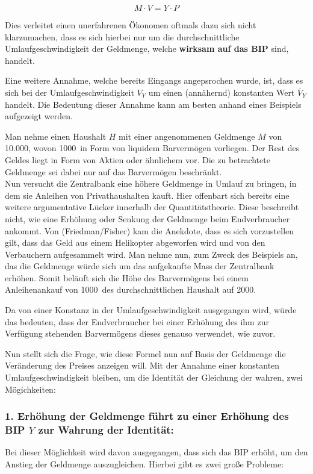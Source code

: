 $$ M \cdot V = Y \cdot P$$

Dies verleitet einen unerfahrenen Ökonomen oftmals dazu sich nicht klarzumachen, dass es sich hierbei nur um die durchschnittliche Umlaufgeschwindigkeit der Geldmenge, welche \textbf{wirksam auf das BIP} sind, handelt.

Eine weitere Annahme, welche bereits Eingangs angepsrochen wurde, ist, dass es sich bei der Umlaufgeschwindigkeit $V_Y$ um einen (annähernd) konstanten Wert $\overline{V}_Y$ handelt. Die Bedeutung dieser Annahme kann am besten anhand eines Beispiels aufgezeigt werden.

\begin{example}
    Man nehme einen Haushalt $H$ mit einer angenommenen Geldmenge $M$ von 10.000\EUR, wovon 1000\EUR\ in Form von liquidem Barvermögen vorliegen. Der Rest des Geldes liegt in Form von Aktien oder ähnlichem vor. Die zu betrachtete Geldmenge sei dabei nur auf das Barvermögen beschränkt. \\
    Nun versucht die Zentralbank eine höhere Geldmenge in Umlauf zu bringen, in dem sie Anleihen von Privathaushalten kauft. Hier offenbart sich bereits eine weitere argumentative Lücker innerhalb der Quantitätstheorie. Diese beschreibt nicht, wie eine Erhöhung oder Senkung der Geldmenge beim Endverbraucher ankommt. Von (Friedman/Fisher) kam die Anekdote, dass es sich vorzustellen gilt, dass das Geld aus einem Helikopter abgeworfen wird und von den Verbauchern aufgesammelt wird. Man nehme nun, zum Zweck des Beispiels an, das die Geldmenge würde sich um das aufgekaufte Mass der Zentralbank erhöhen. Somit beläuft sich die Höhe des Barvermögens bei einem Anleihenankauf von 1000\EUR\, des durchschnittlichen Haushalt auf 2000\EUR. 

    Da von einer Konstanz in der Umlaufgeschwindigkeit ausgegangen wird, würde das bedeuten, dass der Endverbraucher bei einer Erhöhung des ihm zur Verfügung stehenden Barvermögens dieses genauso verwendet, wie zuvor. 
\end{example}\label{Bsp.kUmlauf}

Nun stellt sich die Frage, wie diese Formel nun auf Basis der Geldmenge die Veränderung des Preises anzeigen will. Mit der Annahme einer konstanten Umlaufgeschwindigkeit bleiben, um die Identität der Gleichung der wahren, zwei Mögichkeiten:

\subsubsection*{1. Erhöhung der Geldmenge führt zu einer Erhöhung des BIP $Y$ zur Wahrung der Identität:}
Bei dieser Möglichkeit wird davon ausgegangen, dass sich das BIP erhöht, um den Anstieg der Geldmenge auszugleichen. Hierbei gibt es zwei große Probleme:

